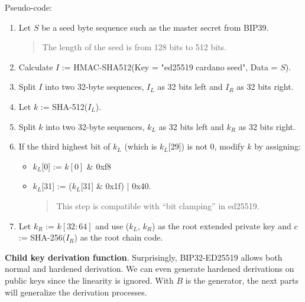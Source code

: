 Pseudo-code:
\begin{enumerate}
    \item Let $S$ be a seed byte sequence such as the master secret from BIP39.
          \begin{quote}
              The length of the seed is from 128 bits to 512 bits.
          \end{quote}
          \bigskip

    \item Calculate $I$ := HMAC-SHA512(Key = "ed25519 cardano seed", Data = $S$).
          \bigskip
    \item Split $I$ into two 32-byte sequences, $I_L$ as 32 bits left and $I_R$ as 32 bits right.
          \bigskip

    \item Let $k$ := SHA-512($I_L$).
          \bigskip
    \item Split $k$ into two 32-byte sequences, $k_L$ as 32 bits left and $k_R$ as 32 bits right.
          \bigskip
    \item If the third highest bit of $k_L$ (which is $k_L$[29]) is not 0, modify $k$ by assigning:
          \begin{itemize}
              \item $k_L$[0] := $k[0]$ \& 0xf8
              \item $k_L$[31] := ($k_L$[31] \& 0x1f) | 0x40.
                    \begin{quote}
                        This step is compatible with “bit clamping” in ed25519.
                    \end{quote}
          \end{itemize}
          \bigskip
    \item Let $k_R$ := $k[32:64]$ and use ($k_L$, $k_R$) as the root extended private key and $c$ := SHA-256($I_R$) as the root chain code.
\end{enumerate}

\bigskip
{\textbf{Child key derivation function}}. Surprisingly, BIP32-ED25519 allows both normal and hardened derivation. We can even generate hardened derivations on public keys since the linearity is ignored. With $B$ is the generator, the next parts will generalize the derivation processes.

